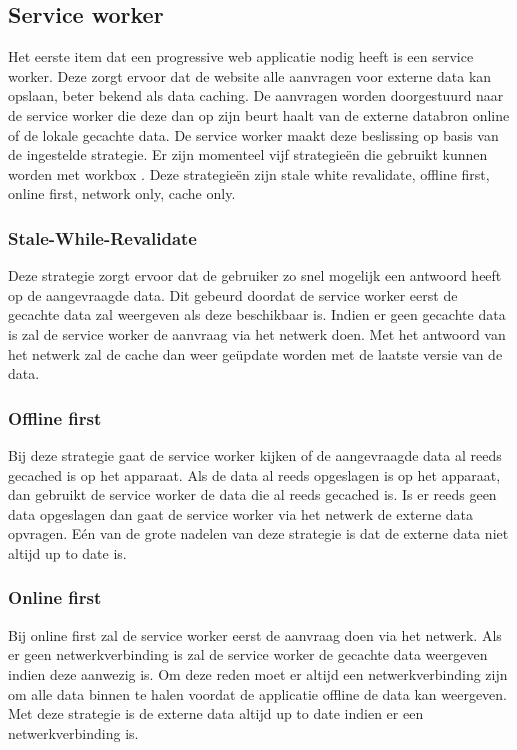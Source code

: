 \subsection{Service worker}
Het eerste item dat een progressive web applicatie nodig heeft is een service worker. Deze zorgt ervoor dat de website alle aanvragen voor externe data kan opslaan, beter bekend als data caching. De aanvragen worden doorgestuurd naar de service worker die deze dan op zijn beurt haalt van de externe databron online of de lokale gecachte data. De service worker maakt deze beslissing op basis van de ingestelde strategie. Er zijn momenteel vijf strategieën die gebruikt kunnen worden met workbox \cite{WORKBOX_STRATEGIES}. Deze strategieën zijn stale white revalidate, offline first, online first, network only, cache only.

\subsubsection{Stale-While-Revalidate}
Deze strategie zorgt ervoor dat de gebruiker zo snel mogelijk een antwoord heeft op de aangevraagde data. Dit gebeurd doordat de service worker eerst de gecachte data zal weergeven als deze beschikbaar is. Indien er geen gecachte data is zal de service worker de aanvraag via het netwerk doen. Met het antwoord van het netwerk zal de cache dan weer geüpdate worden met de laatste versie van de data.

\subsubsection{Offline first}
Bij deze strategie gaat de service worker kijken of de aangevraagde data al reeds gecached is op het apparaat. Als de data al reeds opgeslagen is op het apparaat, dan gebruikt de service worker de data die al reeds gecached is. Is er reeds geen data opgeslagen dan gaat de service worker via het netwerk de externe data opvragen. Eén van de grote nadelen van deze strategie is dat de externe data niet altijd up to date is.

\subsubsection{Online first}
Bij online first zal de service worker eerst de aanvraag doen via het netwerk. Als er geen netwerkverbinding is zal de service worker de gecachte data weergeven indien deze aanwezig is. Om deze reden moet er altijd een netwerkverbinding zijn om alle data binnen te halen voordat de applicatie offline de data kan weergeven. Met deze strategie is de externe data altijd up to date indien er een netwerkverbinding is.

